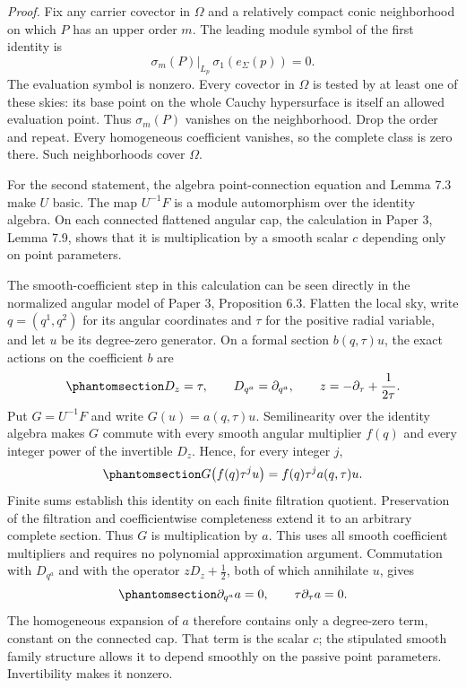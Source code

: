 \documentclass[
  english,
  11pt,
  reqno]{amsart}
\begin{document}
\emph{Proof.} Fix any carrier covector in \(\Omega\) and a relatively
compact conic neighborhood on which \(P\) has an upper order \(m\). The
leading module symbol of the first identity is \[
\sigma_m(P)|_{L_p}\,\sigma_1(e_\Sigma(p))=0.
\] The evaluation symbol is nonzero. Every covector in \(\Omega\) is
tested by at least one of these skies: its base point on the whole
Cauchy hypersurface is itself an allowed evaluation point. Thus
\(\sigma_m(P)\) vanishes on the neighborhood. Drop the order and repeat.
Every homogeneous coefficient vanishes, so the complete class is zero
there. Such neighborhoods cover \(\Omega\).

For the second statement, the algebra point-connection equation and
Lemma 7.3 make \(U\) basic. The map \(U^{-1}F\) is a module automorphism
over the identity algebra. On each connected flattened angular cap, the
calculation in Paper 3, Lemma 7.9, shows that it is multiplication by a
smooth scalar \(c\) depending only on point parameters.

The smooth-coefficient step in this calculation can be seen directly in
the normalized angular model of Paper 3, Proposition 6.3. Flatten the
local sky, write \(q=(q^1,q^2)\) for its angular coordinates and
\(\tau\) for the positive radial variable, and let \(u\) be its
degree-zero generator. On a formal section \(b(q,\tau)u\), the exact
actions on the coefficient \(b\) are
\begin{equation}\protect\phantomsection\label{eq:global-flattened-module-rigidity-actions}{
D_z=\tau,
\qquad D_{q^a}=\partial_{q^a},
\qquad z=-\partial_\tau+\frac{1}{2\tau}.
}\end{equation} Put \(G=U^{-1}F\) and write \(G(u)=a(q,\tau)u\).
Semilinearity over the identity algebra makes \(G\) commute with every
smooth angular multiplier \(f(q)\) and every integer power of the
invertible \(D_z\). Hence, for every integer \(j\),
\begin{equation}\protect\phantomsection\label{eq:global-module-smooth-coefficient-commutant}{
G\bigl(f(q)\tau^j u\bigr)
=f(q)\tau^j a(q,\tau)u.
}\end{equation} Finite sums establish this identity on each finite
filtration quotient. Preservation of the filtration and coefficientwise
completeness extend it to an arbitrary complete section. Thus \(G\) is
multiplication by \(a\). This uses all smooth coefficient multipliers
and requires no polynomial approximation argument. Commutation with
\(D_{q^a}\) and with the operator \(zD_z+\tfrac12\), both of which
annihilate \(u\), gives
\begin{equation}\protect\phantomsection\label{eq:global-module-residual-scalar-equations}{
\partial_{q^a}a=0,
\qquad \tau\partial_\tau a=0.
}\end{equation} The homogeneous expansion of \(a\) therefore contains
only a degree-zero term, constant on the connected cap. That term is the
scalar \(c\); the stipulated smooth family structure allows it to depend
smoothly on the passive point parameters. Invertibility makes it
nonzero.
\end{document}
